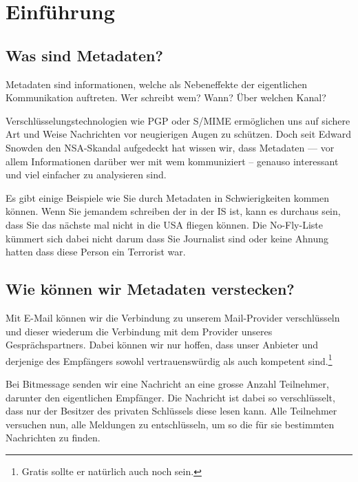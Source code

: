   \section{Einführung}

  \subsection{Was sind Metadaten?}

  Metadaten sind informationen, welche als Nebeneffekte der eigentlichen Kommunikation auftreten. Wer schreibt wem? Wann? Über welchen Kanal?

  Verschlüsselungstechnologien wie PGP oder S/MIME ermöglichen uns auf sichere Art und Weise Nachrichten vor neugierigen Augen zu schützen. Doch seit Edward Snowden den NSA-Skandal aufgedeckt hat wissen wir, dass Metadaten --- vor allem Informationen darüber wer mit wem kommuniziert -- genauso interessant und viel einfacher zu analysieren sind.

  Es gibt einige Beispiele wie Sie durch Metadaten in Schwierigkeiten kommen können. Wenn Sie jemandem schreiben der in der IS ist, kann es durchaus sein, dass Sie das nächste mal nicht in die USA fliegen können. Die No-Fly-Liste kümmert sich dabei nicht darum dass Sie Journalist sind oder keine Ahnung hatten dass diese Person ein Terrorist war.

  \subsection{Wie können wir Metadaten verstecken?}

  Mit E-Mail können wir die Verbindung zu unserem Mail-Provider verschlüsseln und dieser wiederum die Verbindung mit dem Provider unseres Gesprächspartners. Dabei können wir nur hoffen, dass unser Anbieter und derjenige des Empfängers sowohl vertrauenswürdig als auch kompetent sind.\footnote{Gratis sollte er natürlich auch noch sein.}

  Bei Bitmessage senden wir eine Nachricht an eine grosse Anzahl Teilnehmer, darunter den eigentlichen Empfänger. Die Nachricht ist dabei so verschlüsselt, dass nur der Besitzer des privaten Schlüssels diese lesen kann. Alle Teilnehmer versuchen nun, alle Meldungen zu entschlüsseln, um so die für sie bestimmten Nachrichten zu finden.